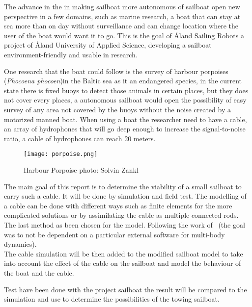 The advance in the in making sailboat more autonomous of sailboat open new perspective in a few domains, such as marine research, a boat that can stay at sea more than on day without surveillance and can change location where the user of the boat would want it to go. This is the goal of \r{A}land Sailing Robots a project of \r{A}land University of Applied Science, developing a sailboat environment-friendly and usable in research.

One research that the boat could follow is the survey of harbour porpoises (\textit{Phocoena phocoen})in the Baltic sea as it an endangered species, in the current state there is fixed buoys to detect those animals in certain places,  but they does not cover every places, a autonomous sailboat would open the possibility of easy survey of any area not covered by the buoys without the noise created by a motorized manned boat.
When using a boat the researcher need to have a cable, an array of hydrophones that will go deep enough to increase the signal-to-noise ratio, a cable of hydrophones can reach 20 meters.

\begin{figure}[H]
\centering
    \texttt{[image: porpoise.png]}
    \caption[Caption for LOF]{Harbour Porpoise  photo: Solvin Zankl }
    \label{fig:porpoise}
\end{figure}

The main goal of this report is to determine the viability of a small sailboat to carry such a cable. It will be done by simulation and field test. The modelling of a cable can be done with different ways such as finite elements for the more complicated solutions or by assimilating the cable as multiple connected rods. The last method as been chosen for the model. Following the work of~\cite{johansen2007modelling} (the goal was to not be dependent on a particular external software for multi-body dynamics).\\
The cable simulation will be then added to the modified sailboat model to take into account the effect of
the cable on the sailboat and model the behaviour of the boat and the cable.

Test have been done with the project sailboat the result will be compared to the simulation and use to determine the possibilities of the towing sailboat.

